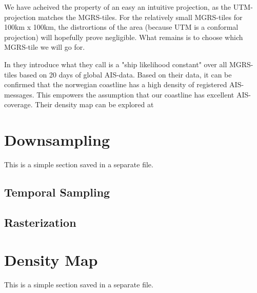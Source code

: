 We have acheived the property of an easy an intuitive projection, as the UTM-projection matches the MGRS-tiles. For the relatively small MGRS-tiles for 100km x 100km, the distrortions of the area (because UTM is a conformal projection) will hopefully prove negligible. What remains is to choose which MGRS-tile we will go for. 

In \cite{Tofting2018} they introduce what they call is a "ship likelihood constant" over all MGRS-tiles based on 20 days of global AIS-data. Based on their data, it can be confirmed that the norwegian coastline has a high density of registered AIS-messages. This empowers the assumption that our coastline has excellent AIS-coverage. Their density map can be explored at \cite{Tofting}




\section{Downsampling}
\begin{info}{}
	This is a simple section saved in a separate file.
\end{info}
\subsection{Temporal Sampling}
\subsection{Rasterization}






\section{Density Map}
\begin{info}{}
	This is a simple section saved in a separate file.
\end{info}






